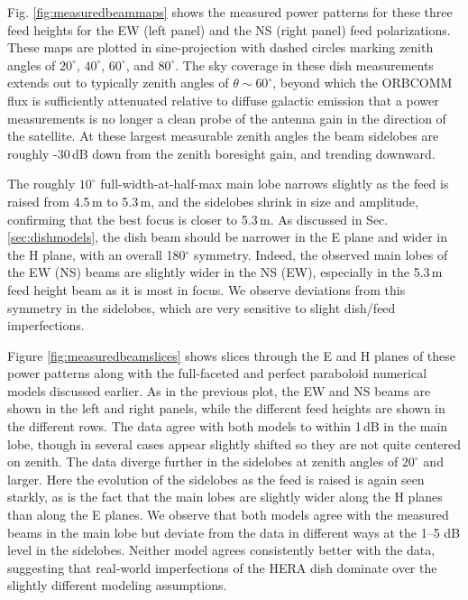 \documentclass{emulateapj}
\begin{document}
Fig. \ref{fig:measuredbeammaps} shows the measured power patterns for these three feed heights for the EW (left panel) and the NS (right panel) feed polarizations. These maps are plotted in sine-projection with dashed circles marking zenith angles of $20^\circ$, $40^\circ$, $60^\circ$, and $80^\circ$. The sky coverage in these dish measurements extends out to typically zenith angles of $\theta\sim60^\circ$, beyond which the ORBCOMM flux is sufficiently attenuated relative to diffuse galactic emission that a power measurements is no longer a clean probe of the antenna gain in the direction of the satellite. At these largest measurable zenith angles the beam sidelobes are roughly -30\,dB down from the zenith boresight gain, and trending downward. 

The roughly $10^\circ$ full-width-at-half-max main lobe narrows slightly as the feed is raised from 4.5\,m to 5.3\,m, and the sidelobes shrink in size and amplitude, confirming that the best focus is closer to 5.3\,m. As discussed in Sec. \ref{sec:dishmodels}, the dish beam should be narrower in the E plane and wider in the H plane, with an overall 180$^\circ$ symmetry. Indeed, the observed main lobes of the EW (NS) beams are slightly wider in the NS (EW), especially in the 5.3\,m feed height beam as it is most in focus. We observe deviations from this symmetry in the sidelobes, which are very sensitive to slight dish/feed imperfections. 

Figure \ref{fig:measuredbeamslices} shows slices through the E and H planes of these power patterns along with the full-faceted and perfect paraboloid numerical models discussed earlier. As in the previous plot, the EW and NS beams are shown in the left and right panels, while the different feed heights are shown in the different rows. The data agree with both models to within 1\,dB in the main lobe, though in several cases appear slightly shifted so they are not quite centered on zenith. The data diverge further in the sidelobes at zenith angles of $20^\circ$ and larger. Here the evolution of the sidelobes as the feed is raised is again seen starkly, as is the fact that the main lobes are slightly wider along the H planes than along the E planes. We observe that both models agree with the measured beams in the main lobe but deviate from the data in different ways at the 1--5 dB level in the sidelobes. Neither model agrees consistently better with the data, suggesting that real-world imperfections of the HERA dish dominate over the slightly different modeling assumptions. 
\end{document}
